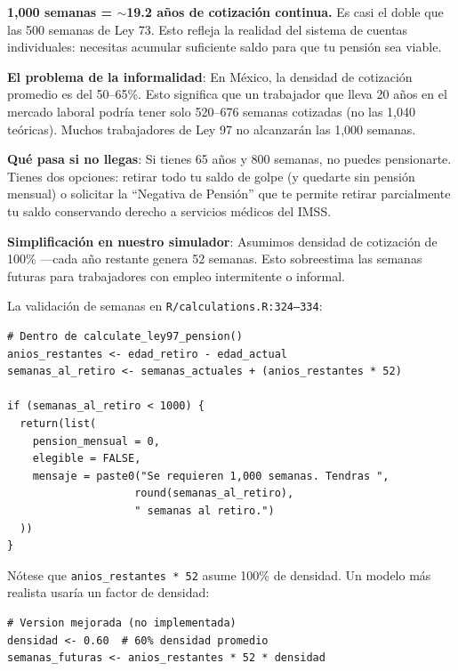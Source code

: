\documentclass[11pt,a4paper]{report}
\begin{document}
\begin{tcolorbox}[colback=green!5!white, colframe=green!50!black, title=\textbf{Intuici\'on}]
\textbf{1,000 semanas = $\sim$19.2 a\~nos de cotizaci\'on continua.} Es casi el doble que las 500 semanas de Ley 73. Esto refleja la realidad del sistema de cuentas individuales: necesitas acumular suficiente saldo para que tu pensi\'on sea viable.

\textbf{El problema de la informalidad}: En M\'exico, la densidad de cotizaci\'on promedio es del 50--65\%. Esto significa que un trabajador que lleva 20 a\~nos en el mercado laboral podr\'ia tener solo 520--676 semanas cotizadas (no las 1,040 te\'oricas). Muchos trabajadores de Ley 97 no alcanzar\'an las 1,000 semanas.

\textbf{Qu\'e pasa si no llegas}: Si tienes 65 a\~nos y 800 semanas, no puedes pensionarte. Tienes dos opciones: retirar todo tu saldo de golpe (y quedarte sin pensi\'on mensual) o solicitar la ``Negativa de Pensi\'on'' que te permite retirar parcialmente tu saldo conservando derecho a servicios m\'edicos del IMSS.

\textbf{Simplificaci\'on en nuestro simulador}: Asumimos densidad de cotizaci\'on de 100\% ---cada a\~no restante genera 52 semanas. Esto sobreestima las semanas futuras para trabajadores con empleo intermitente o informal.
\end{tcolorbox}

\begin{tcolorbox}[colback=orange!5!white, colframe=orange!75!black, title=\textbf{Aplicaci\'on en C\'odigo}]
La validaci\'on de semanas en \texttt{R/calculations.R:324--334}:

\begin{lstlisting}
# Dentro de calculate_ley97_pension()
anios_restantes <- edad_retiro - edad_actual
semanas_al_retiro <- semanas_actuales + (anios_restantes * 52)

if (semanas_al_retiro < 1000) {
  return(list(
    pension_mensual = 0,
    elegible = FALSE,
    mensaje = paste0("Se requieren 1,000 semanas. Tendras ",
                    round(semanas_al_retiro),
                    " semanas al retiro.")
  ))
}
\end{lstlisting}

N\'otese que \texttt{anios\_restantes * 52} asume 100\% de densidad. Un modelo m\'as realista usar\'ia un factor de densidad:
\begin{lstlisting}
# Version mejorada (no implementada)
densidad <- 0.60  # 60% densidad promedio
semanas_futuras <- anios_restantes * 52 * densidad
\end{lstlisting}
\end{tcolorbox}
\end{document}
